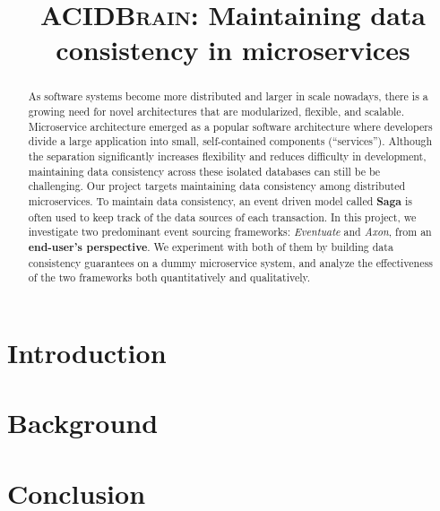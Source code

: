 \documentclass[journal,11pt,onecolumn]{assets/IEEEtran}
\begin{document}
\title{\textsc{ACIDBrain}: Maintaining data consistency in microservices}

\author{

}

\maketitle


\begin{abstract}
    As software systems become more distributed and larger in scale nowadays, there is a growing need for novel architectures that are modularized, flexible, and scalable. Microservice architecture emerged as a popular software architecture where developers divide a large application into small, self-contained components (“services”). Although the separation significantly increases flexibility and reduces difficulty in development, maintaining data consistency across these isolated databases can still be be challenging. Our project targets maintaining data consistency among distributed microservices. To maintain data consistency, an event driven model called \textbf{Saga}\cite{garcia1987sagas} is often used to keep track of the data sources of each transaction. In this project, we investigate two predominant event sourcing frameworks: \textit{Eventuate} and \textit{Axon}, from an \textbf{end-user’s perspective}. We experiment with both of them by building data consistency guarantees on a dummy microservice system, and analyze the effectiveness of the two frameworks both quantitatively and qualitatively.
\end{abstract}



\section{Introduction}


\section{Background}


\section{Conclusion}



\FloatBarrier{}



\end{document}
